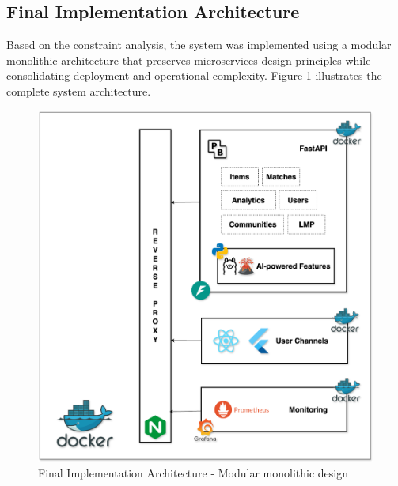 \subsection{Final Implementation Architecture}

Based on the constraint analysis, the system was implemented using a modular monolithic architecture that preserves microservices design principles while consolidating deployment and operational complexity. Figure \ref{fig:final_implementation_architecture} illustrates the complete system architecture.

\begin{figure}[htbp]
\centering
\includegraphics[width=\textwidth]{figs/chapter3/final_implementation_architecture.png}
\caption{Final Implementation Architecture - Modular monolithic design}
\label{fig:final_implementation_architecture}
\end{figure}


